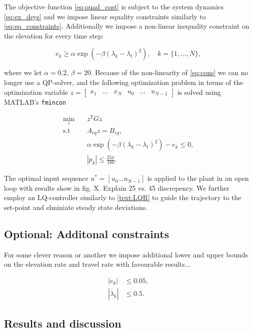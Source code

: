 The objective function \eqref{eq:quad_cost} is subject to the system dynamics \eqref{eq:ex_dsys} and we impose linear equality constraints similarly to \eqref{eq:eq_constraints}. Additionally we impose a non-linear inequality constraint on the elevation for every time step:

\begin{equation}
	\label{eq:cons}
	e_k \ge \alpha \exp{\left(-\beta\left(\lambda_k - \lambda_t\right)^2\right)}, \quad k = \{1, \dots , N\},
\end{equation}

where we let $\alpha = 0.2$, $\beta = 20$. Because of the non-linearity of \eqref{eq:cons} we can no longer use a QP-solver, and the following optimization problem in terms of the optimization variable $z = \begin{bmatrix} x_1 & \dots & x_N & u_0 & \dots & u_{N-1} \end{bmatrix}$ is solved using MATLAB's \texttt{fmincon}

\begin{align*}
	\min_z \quad &z^T G z \\
	\textrm{s.t}\quad &A_{eq} z = B_{eq}, \\
				  &\alpha \exp{\left(-\beta\left(\lambda_k - \lambda_t\right)^2\right)} - e_k \le 0,\\
				  &|p_k| \le \frac{25 \pi}{180}.
\end{align*}

The optimal input sequence $u^* = [u_0 \dots u_{N-1}]$ is applied to the plant in an open loop with results show in fig. X. Explain 25 vs. 45 discrepency. We further employ an LQ-controller similarly to \ref{text:LQR} to guide the trajectory to the set-point and elminiate steady state deviations.

\subsection{Optional: Additonal constraints}
For some clever reason or another we impose additional lower and upper bounds on the elevation rate and travel rate with favourable results...

\begin{align*}
	|\dot{e_k}| &\le 0.05, \\
	|\dot{\lambda_k}| &\le 0.5.
\end{align*}
\subsection{Results and discussion}



